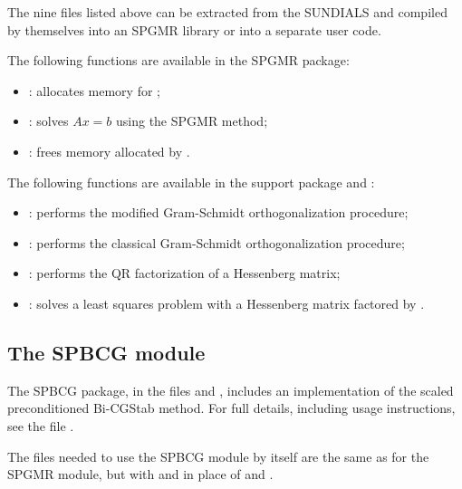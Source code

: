 \documentclass[letterpaper,10pt,english]{sphinxmanual}
\begin{document}
The nine files listed above can be extracted from the SUNDIALS
 and compiled by themselves into an SPGMR library or into a
separate user code.

The following functions are available in the SPGMR package:
\begin{itemize}
\item {} 
: allocates memory for ;

\item {} 
: solves $Ax = b$ using the SPGMR method;

\item {} 
: frees memory allocated by .

\end{itemize}

The following functions are available in the support package
 and :
\begin{itemize}
\item {} 
: performs the modified Gram-Schmidt orthogonalization
procedure;

\item {} 
: performs the classical Gram-Schmidt
orthogonalization procedure;

\item {} 
: performs the QR factorization of a Hessenberg matrix;

\item {} 
: solves a least squares problem with a Hessenberg matrix
factored by .

\end{itemize}


\subsection{The SPBCG module}
\label{linear_solvers/SPILS:the-spbcg-module}
The SPBCG package, in the files  and
, includes an implementation of the scaled
preconditioned Bi-CGStab method. For full details, including usage
instructions, see the file .

The files needed to use the SPBCG module by itself are the same as for
the SPGMR module, but with  and
 in place of  and
.
\end{document}
